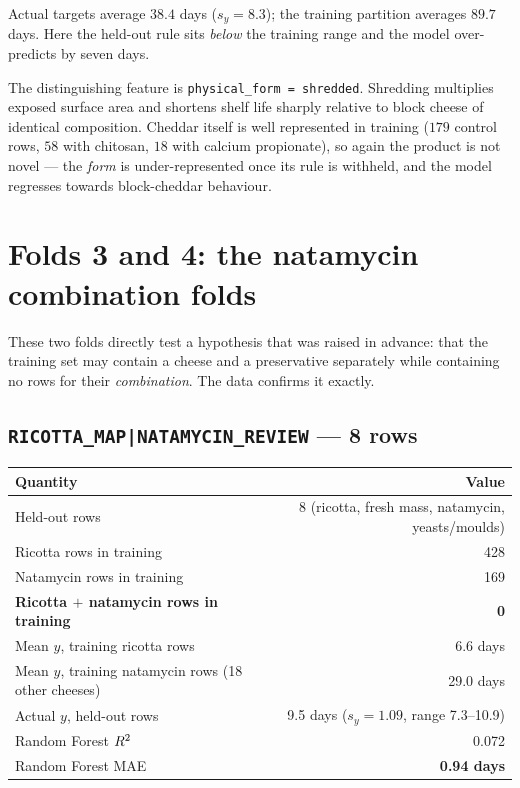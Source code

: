 Actual targets average $38.4$ days ($s_y = 8.3$); the training partition
averages $89.7$ days. Here the held-out rule sits \emph{below} the training
range and the model over-predicts by seven days.

The distinguishing feature is \texttt{physical\_form = shredded}. Shredding
multiplies exposed surface area and shortens shelf life sharply relative to
block cheese of identical composition. Cheddar itself is well represented
in training ($179$ control rows, $58$ with chitosan, $18$ with calcium
propionate), so again the product is not novel --- the \emph{form} is
under-represented once its rule is withheld, and the model regresses
towards block-cheddar behaviour.

\section{Folds 3 and 4: the natamycin combination folds}
\label{sec:fold-natamycin}

These two folds directly test a hypothesis that was raised in advance: that
the training set may contain a cheese and a preservative separately while
containing no rows for their \emph{combination}. The data confirms it
exactly.

\subsection{\texttt{RICOTTA\_MAP|NATAMYCIN\_REVIEW} --- 8 rows}

\begin{center}\small
\begin{tabular}{lr}
\toprule
Quantity & Value \\
\midrule
Held-out rows & 8 (ricotta, fresh mass, natamycin, yeasts/moulds) \\
Ricotta rows in training & 428 \\
Natamycin rows in training & 169 \\
\textbf{Ricotta $+$ natamycin rows in training} & \textbf{0} \\
Mean $y$, training ricotta rows & 6.6 days \\
Mean $y$, training natamycin rows (18 other cheeses) & 29.0 days \\
Actual $y$, held-out rows & 9.5 days ($s_y = 1.09$, range 7.3--10.9) \\
Random Forest $R^2$ & 0.072 \\
Random Forest MAE & \textbf{0.94 days} \\
\bottomrule
\end{tabular}
\end{center}

